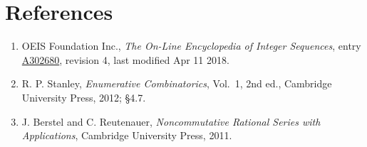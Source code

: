 \documentclass[11pt]{article}
\theoremstyle{definition}
\begin{document}
\section{References}

\begin{enumerate}

\item OEIS Foundation Inc., \emph{The On-Line Encyclopedia of Integer Sequences}, entry \href{https://oeis.org/A302680}{A302680}, revision 4, last modified Apr 11 2018.

\item R. P. Stanley, \emph{Enumerative Combinatorics}, Vol.~1, 2nd ed., Cambridge University Press, 2012; \S4.7.

\item J. Berstel and C. Reutenauer, \emph{Noncommutative Rational Series with Applications}, Cambridge University Press, 2011.

\end{enumerate}
\end{document}
